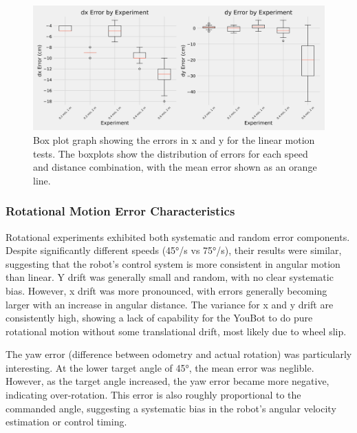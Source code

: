 \documentclass[a4paper, 12pt]{article}
\begin{document}
    \begin{figure}[H]
        \centering
        \includegraphics[width=0.99\linewidth]{images/experiment_results/linear_error_boxplots.png}
        \caption{Box plot graph showing the errors in x and y for the linear motion tests. The boxplots show the distribution of errors for each speed and distance combination, with the mean error shown as an orange line.}
    \end{figure}

    \subsubsection{Rotational Motion Error Characteristics}

    Rotational experiments exhibited both systematic and random error components. Despite significantly different speeds (45°/s vs 75°/s), their results were similar, suggesting that the robot's control system is more consistent in angular motion than linear. Y drift was generally small and random, with no clear systematic bias. However, x drift was more pronounced, with errors generally becoming larger with an increase in angular distance. The variance for x and y drift are consistently high, showing a lack of capability for the YouBot to do pure rotational motion without some translational drift, most likely due to wheel slip. 

    The yaw error (difference between odometry and actual rotation) was particularly interesting. At the lower target angle of 45°, the mean error was neglible. However, as the target angle increased, the yaw error became more negative, indicating over-rotation. This error is also roughly proportional to the commanded angle, suggesting a systematic bias in the robot's angular velocity estimation or control timing. 
\end{document}
